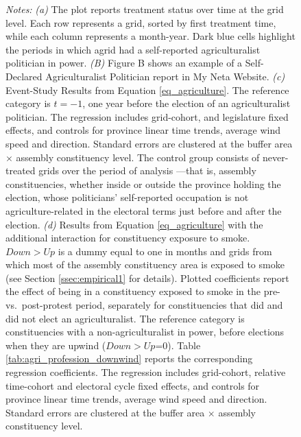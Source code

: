 \documentclass[12pt]{article}
\begin{document}
{\begin{figure}[hbtp!]
    
    \begin{minipage}{\textwidth}
        {\small \textit{Notes: }\textit{(a)} 
        The plot reports treatment status over time at the grid level. Each row represents a grid, sorted by first treatment time, while each column represents a month-year. Dark blue cells highlight the periods in which agrid had a self-reported agriculturalist politician in power.
        \textit{(B)} Figure B shows an example of a Self-Declared Agriculturalist Politician report in My Neta Website.  
        \textit{(c)} Event-Study Results from Equation \ref{eq_agriculture}. %
        The reference category is $t=-1$, one year before the election of an agriculturalist politician. 
        The regression includes grid-cohort, and legislature fixed effects, and controls for province linear time trends, average wind speed and direction. Standard errors are clustered at the buffer area $\times$ assembly constituency level. The control group consists of never-treated grids over the period of analysis ---that is, assembly constituencies, whether inside or outside the province holding the election, whose politicians' self-reported occupation is not agriculture-related in the electoral terms just before and after the election. 
        \textit{(d)} Results from Equation \ref{eq_agriculture} with the additional interaction for constituency exposure to smoke. $Down>Up$ is a dummy equal to one in months and grids from which most of the assembly constituency area is exposed to smoke (see Section \ref{ssec:empirical1} for details).
        Plotted coefficients report the effect of being in a constituency exposed to smoke in the pre- vs.\ post-protest period, separately for constituencies that did and did not elect an agriculturalist. The reference category is constituencies with a non-agriculturalist in power, before elections when they are upwind ($Down>Up$=0).
        Table \ref{tab:agri_profession_downwind} reports the corresponding regression coefficients.
        The regression includes grid-cohort, relative time-cohort and electoral cycle fixed effects, and controls for province linear time trends, average wind speed and direction. Standard errors are clustered at the buffer area $\times$ assembly constituency level.
        }
    \end{minipage}
\end{figure}

}
\end{document}
